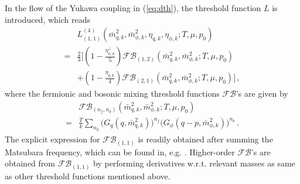 \documentclass[%
reprint,
superscriptaddress,
showpacs,preprintnumbers,
 amsmath,amssymb,
 aps,
prd,
]{revtex4-1}
\begin{document}
In the flow of the Yukawa coupling in (\ref{eq:dth}), the threshold function $L$ is introduced, which reads
\begin{align}
  &L^{(4)}_{(1,1)}(\bar{m}^{2}_{q,k},\bar{m}^{2}_{\phi,k},\eta_{q,k},\eta_{\phi,k};T,\mu,p_0)\nonumber\\[2ex]
  =&\frac{2}{3}\bigg[\left(1-\frac{\eta_{\phi,k}^{\perp}}{5}\right)\mathcal{FB}_{(1,2)}(\bar{m}^{2}_{q,k},\bar{m}^{2}_{\phi,k};T,\mu,p_0)\nonumber\\[2ex]
&+\left(1-\frac{\eta_{q,k}}{4}\right)\mathcal{FB}_{(2,1)}(\bar{m}^{2}_{q,k},\bar{m}^{2}_{\phi,k};T,\mu,p_0)\bigg]\,,
\end{align} 
where the fermionic and bosonic mixing threshold functions $\mathcal{FB}$'s are given by
\begin{align}
 &\mathcal{FB}_{(n_f,n_b)}(\bar{m}^{2}_{q,k},\bar{m}^{2}_{\phi,k};T,\mu,p_0)\nonumber \\[2ex] 
  =&\frac{T}{k}\sum_{n_q}\Big(G_{q}(q,\bar{m}^{2}_{q,k})\Big)^{n_f}\Big(G_{\phi}(q-p,\bar{m}^{2}_{\phi,k})\Big)^{n_b}\,.\label{eq:FB}
\end{align}
The explicit expression for $\mathcal{FB}_{(1,1)}$ is readily obtained after summing the Matsubara frequency, which can be found in, e.g. \cite{Fu:2015naa}. Higher-order $\mathcal{FB}$'s are obtained from $\mathcal{FB}_{(1,1)}$ by performing derivatives w.r.t. relevant masses as same as other threshold functions mentioned above.







\end{document}
